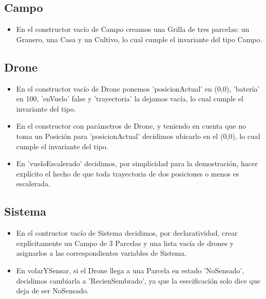 \subsection{Campo}

\begin{itemize}
\item{En el constructor vac\'io de Campo creamos una Grilla de tres parcelas:
un Granero,
una Casa y un Cultivo, lo cual cumple el invariante del tipo Campo.}
	
	
\end{itemize}
 
\subsection{Drone}
 
\begin{itemize}
 
\item{En el constructor vac\'io de Drone ponemos 'posicionActual' en (0,0),
 'bater\'ia' en 100, 'enVuelo' false y 'trayectoria' la dejamos vac\'ia,
  lo cual cumple el invariante del tipo.} 

\item{En el constructor con par\'ametros de Drone, y teniendo en cuenta que no toma un Posici\'on para 'posicionActual' decidimos ubicarlo en el (0,0),
  lo cual cumple el invariante del tipo.} 
  
\item{En 'vueloEscalerado' decidimos, por simplicidad para la demostraci\'on, hacer expl\'icito el hecho de que toda trayectoria de dos posiciones o menos es escalerada.}
 
\end{itemize}


\subsection{Sistema}

\begin{itemize}

\item{En el contructor vac\'io de Sistema decidimos, por declaratividad, crear expl\'icitamente un Campo de 3 Parcelas y una lista vac\'ia de drones y asignarlos a las correspondientes variables de Sistema.}

\item{En volarYSensar, si el Drone llega a una Parcela en estado 'NoSensado', decidimos cambiarla a 'RecienSembrado', ya que la esecificaci\'on solo dice que deja de ser NoSensado. }

\end{itemize}
